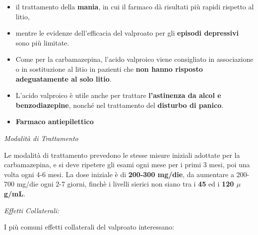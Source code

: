 \begin{itemize}
\begin{itemize}
\item
  il trattamento della \textbf{mania}, in cui il farmaco dà risultati
  più rapidi rispetto al litio,
\item
  mentre le evidenze dell'efficacia del valproato per gli
  \textbf{episodi depressivi} sono più limitate.
\item
  Come per la carbamazepina, l'acido valproico viene consigliato in
  associazione o in sostituzione al litio in pazienti che \textbf{non
  hanno risposto adeguatamente al solo litio}.
\item
  L'acido valproico è utile anche per trattare \textbf{l'astinenza da
  alcol e benzodiazepine}, nonché nel trattamento del \textbf{disturbo
  di panico}.
\item
  \textbf{Farmaco antiepilettico}
\end{itemize}

\emph{\emph{Modalità di Trattamento}}

Le modalità di trattamento prevedono le stesse misure iniziali adottate
per la carbamazepina, e si deve ripetere gli esami ogni mese per i primi
3 mesi, poi una volta ogni 4-6 mesi. La dose iniziale è di
\textbf{200-300 mg/die}, da aumentare a 200-700 mg/die ogni 2-7 giorni,
finchè i livelli sierici non siano tra i \textbf{45} ed i \textbf{120
$\mu$g/mL}.

\emph{\emph{Effetti Collaterali:}}

I più comuni effetti collaterali del valproato interessano:


\end{itemize}
